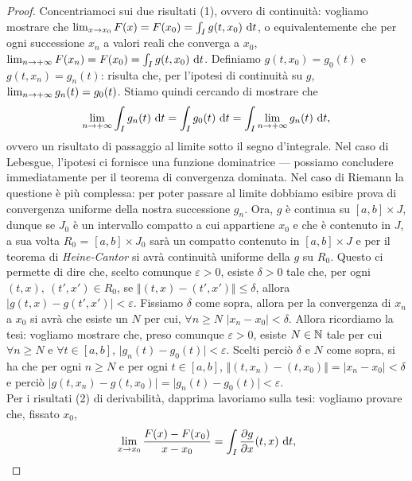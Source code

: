 \documentclass[Completo.tex]{subfiles}
\begin{document}
	\begin{proof}
		Concentriamoci sui due risultati (1), ovvero di continuità: vogliamo mostrare che $\lim_{x \rightarrow x_0} F(x) = F(x_0) = \int_I g(t,x_0) \ \mathrm{d}t$, o equivalentemente che per ogni successione $x_n$ a valori reali che converga a $x_0$, $\lim_{n \rightarrow +\infty} F(x_n) = F(x_0) = \int_I g(t, x_0) \ \mathrm{d}t$. Definiamo $g(t, x_0) = g_0(t)$ e $g(t, x_n) = g_n(t)$: risulta che, per l'ipotesi di continuità su $g$, $\lim_{n \rightarrow +\infty} g_n(t) = g_0(t)$. Stiamo quindi cercando di mostrare che 
		\begin{equation*}
		\lim_{n \ra +\infty} \int_I g_n(t) \ \mathrm{d}t = \int_I g_0(t) \ \mathrm{d}t = \int_I \lim_{n \ra +\infty} g_n(t) \ \mathrm{d}t,
		\end{equation*}
		ovvero un risultato di passaggio al limite sotto il segno d'integrale. Nel caso di Lebesgue, l'ipotesi ci fornisce una funzione dominatrice --- possiamo concludere immediatamente per il teorema di convergenza dominata. Nel caso di Riemann la questione è più complessa: per poter passare al limite dobbiamo esibire prova di convergenza uniforme della nostra successione $g_n$. Ora, $g$ è continua su $[a,b] \times J$, dunque se $J_0$ è un intervallo compatto a cui appartiene $x_0$ e che è contenuto in $J$, a sua volta $R_0$ = $[a,b] \times J_0$ sarà un compatto contenuto in $[a,b] \times J$ e per il teorema di \textit{Heine-Cantor} si avrà continuità uniforme della $g$ su $R_0$. Questo ci permette di dire che, scelto comunque $\varepsilon > 0$, esiste $\delta > 0$ tale che, per ogni $(t, x), \ (t', x') \in R_0$, se $\Vert (t,x) - (t',x') \Vert \leq \delta$, allora $\vert g(t,x) - g(t',x') \vert < \varepsilon$. Fissiamo $\delta$ come sopra, allora per la convergenza di $x_n$ a $x_0$ si avrà che esiste un $N$ per cui, $\forall n \geq N$ $\vert x_n - x_0 \vert < \delta$. Allora ricordiamo la tesi: vogliamo mostrare che, preso comunque $\varepsilon > 0$, esiste $N \in \bb[N]$ tale per cui $\forall n \geq N$ e $\forall t \in [a,b]$, $\vert g_n(t) - g_0(t) \vert < \varepsilon$. Scelti perciò $\delta$ e $N$ come sopra, si ha che per ogni $n \geq N$ e per ogni $t \in [a,b]$, $\Vert (t, x_n) - (t, x_0) \Vert = \vert x_n - x_0 \vert < \delta$ e perciò $\vert g(t, x_n) - g(t, x_0) \vert = \vert g_n(t) - g_0(t) \vert < \varepsilon$. \\
		Per i risultati (2) di derivabilità, dapprima lavoriamo sulla tesi: vogliamo provare che, fissato $x_0$,
		\begin{equation*}
		\lim_{x \ra x_0} \frac{F(x) - F(x_0)}{x - x_0} = \int_I \frac{\pd g}{\pd x}(t,x) \ \mathrm{d}t,

\end{equation*}
\end{proof}
\end{document}
